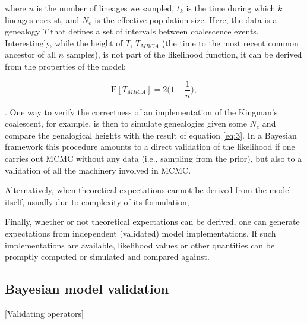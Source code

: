 \documentclass[oneside,twocolumn]{article}
\begin{document}
\noindent where $n$ is the number of lineages we sampled, $t_k$ is the time during which $k$ lineages
coexist, and $N_e$ is the effective population size.
Here, the data is a genealogy $T$ that defines a set of intervals
between coalescence events.
Interestingly, while the height of $T$, $T_{MRCA}$ (the time to the most
recent common ancestor of all $n$ samples), is not part of the
likelihood function, it can be derived from the properties of the
model:

\begin{equation}
  \text{E}[T_{MRCA}] = 2 \bigg(1-\frac{1}{n}\bigg),
  \label{eq:3}
\end{equation}

\noindent \citep{hudson90}.
One way to verify the correctness of an implementation of the Kingman's
coalescent, for example, is then to simulate genealogies given some
$N_e$ and compare the genalogical heights with the result of equation
\ref{eq:3}.
In a Bayesian framework this procedure amounts to a direct validation of the
likelihood if one carries out MCMC without any data (i.e., sampling
from the prior), but also to a validation of all the machinery involved in MCMC.

Alternatively, when theoretical expectations cannot be derived from
the model itself, usually due to complexity of its formulation, {\color{red}{[Place holder for Christiaan's text]}}

Finally, whether or not theoretical expectations can be
derived, one can generate expectations from independent (validated) model implementations.
If such implementations are available, likelihood values or other
quantities can be promptly computed or simulated and compared against.

\subsection*{Bayesian model validation}

[Validating operators]

\vspace{1cm}

\noindent [Coverage]

\vspace{1cm}


\vspace{1cm}

\end{document}
